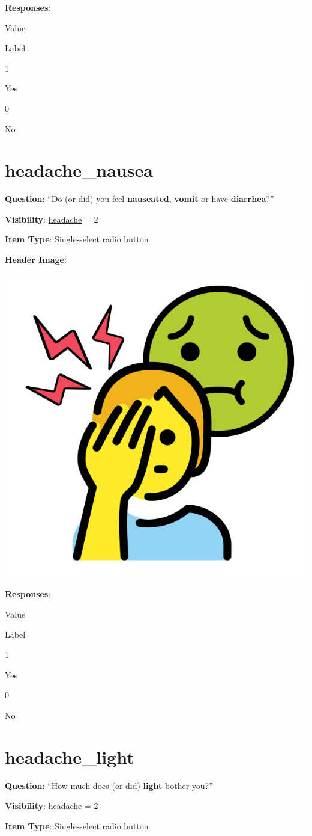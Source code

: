 \documentclass[]{book}
\begin{document}
\textbf{Responses}:

Value

Label

1

Yes

0

No

\hypertarget{headache_nausea}{%
\section{headache\_nausea}\label{headache_nausea}}

\textbf{Question}: ``Do (or did) you feel \textbf{nauseated}, \textbf{vomit} or have \textbf{diarrhea}?''

\textbf{Visibility}: \protect\hyperlink{headache}{headache} = 2

\textbf{Item Type}: Single-select radio button

\textbf{Header Image}:

\begin{flushleft}\includegraphics[width=0.33\linewidth]{downloadFigs4latex_NIMH_Applet_Codebook/headache_nausea_headerImg} \end{flushleft}

\textbf{Responses}:

Value

Label

1

Yes

0

No

\hypertarget{headache_light}{%
\section{headache\_light}\label{headache_light}}

\textbf{Question}: ``How much does (or did) \textbf{light} bother you?''

\textbf{Visibility}: \protect\hyperlink{headache}{headache} = 2

\textbf{Item Type}: Single-select radio button
\end{document}
